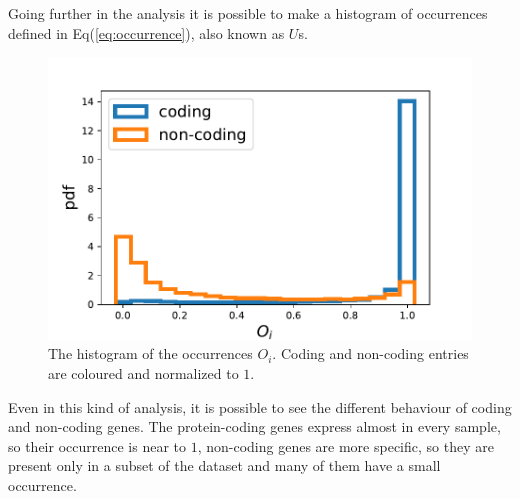Going further in the analysis it is possible to make a histogram of occurrences defined in Eq(\ref{eq:occurrence}), also known as $U$s.
\begin{figure}[htb!]
    \centering
    \includegraphics[width=0.9\linewidth]{pictures/structure/gtex/U_gtex_cnc.pdf}
    \caption{The histogram of the occurrences $O_i$. Coding and non-coding entries are coloured and normalized to $1$.}
    \label{fig:structure/gtex/U_cnc}
\end{figure}
Even in this kind of analysis, it is possible to see the different behaviour of coding and non-coding genes. The protein-coding genes express almost in every sample, so their occurrence is near to $1$, non-coding genes are more specific, so they are present only in a subset of the dataset and many of them have a small occurrence.
